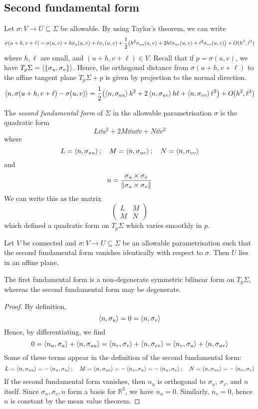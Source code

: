 \subsection{Second fundamental form}
Let \( \sigma \colon V \to U \subseteq \Sigma \) be allowable.
By using Taylor's theorem, we can write
\[
	\sigma(u+h,v+\ell) = \sigma(u,v) + h \sigma_u(u,v) + \ell \sigma_v(u,v) + \frac{1}{2} \qty(h^2 \sigma_{uu}(u,v) + 2h\ell \sigma_{uv}(u,v) + \ell^2 \sigma_{vv}(u,v)) + O(h^3,\ell^3)
\]
where \( h,\ell \) are small, and \( (u+h,v+\ell) \in V \).
Recall that if \( p = \sigma(u,v) \), we have \( T_p \Sigma = \langle{} \qty{\sigma_u,\sigma_v} \rangle \).
Hence, the orthogonal distance from \( \sigma(u+h,v+\ell) \) to the affine tangent plane \( T_p \Sigma + p \) is given by projection to the normal direction.
\[
	\left\langle{n,\sigma(u+h,v+\ell) - \sigma(u,v)}\right\rangle = \frac{1}{2} \qty(\left\langle{n,\sigma_{uu}}\right\rangle h^2 + 2\left\langle{n,\sigma_{uv}}\right\rangle h\ell + \left\langle{n,\sigma_{vv}}\right\rangle\ell^2) + O(h^3,\ell^3)
\]
\begin{definition}
	The \textit{second fundamental form} of \( \Sigma \) in the allowable parametrisation \( \sigma \) is the quadratic form
	\[
		L \dd{u}^2 + 2 M \dd{u} \dd{v} + N \dd{v}^2
	\]
	where
	\[
		L = \left\langle{n,\sigma_{uu}}\right\rangle;\quad M = \left\langle{n,\sigma_{uv}}\right\rangle;\quad N = \left\langle{n,\sigma_{vv}}\right\rangle
	\]
	and
	\[
		n = \frac{\sigma_u \times \sigma_v}{\norm{\sigma_u \times \sigma_v}}
	\]
	We can write this as the matrix
	\[
		\begin{pmatrix}
			L & M \\
			M & N
		\end{pmatrix}
	\]
	which defined a quadratic form on \( T_p \Sigma \) which varies smoothly in \( p \).
\end{definition}
\begin{lemma}
	Let \( V \) be connected and \( \sigma \colon V \to U \subseteq \Sigma \) be an allowable parametrisation such that the second fundamental form vanishes identically with respect to \( \sigma \).
	Then \( U \) lies in an affine plane.
\end{lemma}
\begin{remark}
	The first fundamental form is a non-degenerate symmetric bilinear form on \( T_p \Sigma \), whereas the second fundamental form may be degenerate.
\end{remark}
\begin{proof}
	By definition,
	\[
		\left\langle{n,\sigma_u}\right\rangle = 0 = \left\langle{n,\sigma_v}\right\rangle
	\]
	Hence, by differentiating, we find
	\[
		0 = \left\langle{n_u, \sigma_u}\right\rangle + \left\langle{n, \sigma_{uu}}\right\rangle = \left\langle{n_v, \sigma_v}\right\rangle + \left\langle{n, \sigma_{vv}}\right\rangle = \left\langle{n_v, \sigma_u}\right\rangle + \left\langle{n,\sigma_{uv}}\right\rangle
	\]
	Some of these terms appear in the definition of the second fundamental form:
	\[
		L = \left\langle{n,\sigma_{uu}}\right\rangle = -\left\langle{n_u, \sigma_u}\right\rangle;\quad M = \left\langle{n,\sigma_{uv}}\right\rangle = -\left\langle{n_v, \sigma_u}\right\rangle = -\left\langle{n_u, \sigma_v}\right\rangle;\quad N = \left\langle{n,\sigma_{vv}}\right\rangle = -\left\langle{n_v, \sigma_v}\right\rangle
	\]
	If the second fundamental form vanishes, then \( n_u \) is orthogonal to \( \sigma_u \), \( \sigma_v \), and \( n \) itself.
	Since \( \sigma_u, \sigma_v, n \) form a basis for \( \mathbb R^3 \), we have \( n_u = 0 \).
	Similarly, \( n_v = 0 \), hence \( n \) is constant by the mean value theorem.
\end{proof}
